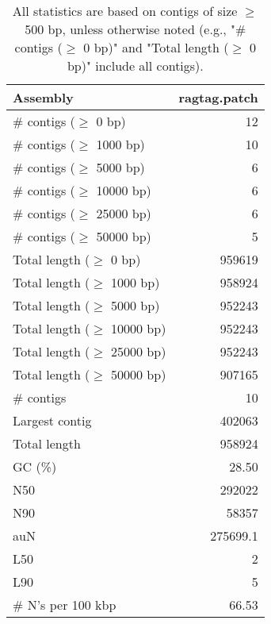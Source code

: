 \documentclass[12pt,a4paper]{article}
\begin{document}
\begin{table}[ht]
\begin{center}
\caption{All statistics are based on contigs of size $\geq$ 500 bp, unless otherwise noted (e.g., "\# contigs ($\geq$ 0 bp)" and "Total length ($\geq$ 0 bp)" include all contigs).}
\begin{tabular}{|l*{1}{|r}|}
\hline
Assembly & ragtag.patch \\ \hline
\# contigs ($\geq$ 0 bp) & 12 \\ \hline
\# contigs ($\geq$ 1000 bp) & 10 \\ \hline
\# contigs ($\geq$ 5000 bp) & 6 \\ \hline
\# contigs ($\geq$ 10000 bp) & 6 \\ \hline
\# contigs ($\geq$ 25000 bp) & 6 \\ \hline
\# contigs ($\geq$ 50000 bp) & 5 \\ \hline
Total length ($\geq$ 0 bp) & 959619 \\ \hline
Total length ($\geq$ 1000 bp) & 958924 \\ \hline
Total length ($\geq$ 5000 bp) & 952243 \\ \hline
Total length ($\geq$ 10000 bp) & 952243 \\ \hline
Total length ($\geq$ 25000 bp) & 952243 \\ \hline
Total length ($\geq$ 50000 bp) & 907165 \\ \hline
\# contigs & 10 \\ \hline
Largest contig & 402063 \\ \hline
Total length & 958924 \\ \hline
GC (\%) & 28.50 \\ \hline
N50 & 292022 \\ \hline
N90 & 58357 \\ \hline
auN & 275699.1 \\ \hline
L50 & 2 \\ \hline
L90 & 5 \\ \hline
\# N's per 100 kbp & 66.53 \\ \hline
\end{tabular}
\end{center}
\end{table}
\end{document}
